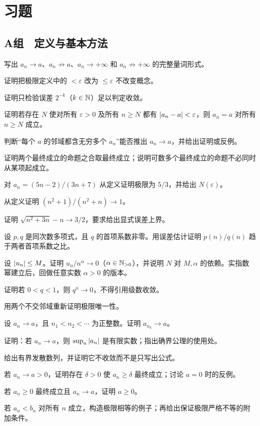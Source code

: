 \section*{习题}

\subsection*{A组　定义与基本方法}
\begin{enumerate}[label=\textbf{\thechapter.\arabic*.},ref=\thechapter.\arabic*,leftmargin=3.4em,labelsep=0.7em,itemsep=0.85em,topsep=0.8em]
  写出 \(a_n\to a\)、\(a_n\not\to a\)、\(a_n\to+\infty\) 和 \(a_n\not\to+\infty\) 的完整量词形式。

  证明把极限定义中的 \(<\varepsilon\) 改为 \(\le\varepsilon\) 不改变概念。

  证明只检验误差 \(2^{-k}\)（\(k\in\mathbb{N}\)）足以判定收敛。

  证明若存在 \(N\) 使对所有 \(\varepsilon>0\) 及所有 \(n\ge N\) 都有 \(\left|a_n-a\right|<\varepsilon\)，则 \(a_n=a\) 对所有 \(n\ge N\) 成立。

  判断“每个 \(a\) 的邻域都含无穷多个 \(a_n\)”能否推出 \(a_n\to a\)，并给出证明或反例。

  证明两个最终成立的命题之合取最终成立；说明可数多个最终成立的命题不必同时从某项起成立。

  对 \(a_n=(5n-2)/(3n+7)\) 从定义证明极限为 \(5/3\)，并给出 \(N(\varepsilon)\)。

  从定义证明 \((n^2+1)/(n^2+n)\to1\)。

  证明 \(\sqrt{n^2+3n}-n\to3/2\)，要求给出显式误差上界。

  设 \(p,q\) 是同次数多项式，且 \(q\) 的首项系数非零。用误差估计证明 \(p(n)/q(n)\) 趋于两者首项系数之比。

  设 \(\left|u_n\right|\le M\)。证明 \(u_n/n^\alpha\to0\)（\(\alpha\in\mathbb{N}_{>0}\)），并说明 \(N\) 对 \(M,\alpha\) 的依赖。实指数幂建立后，回做任意实数 \(\alpha>0\) 的版本。

  证明若 \(0<q<1\)，则 \(q^n\to0\)，不得引用级数收敛。

  用两个不交邻域重新证明极限唯一性。

  设 \(a_n\to a\)，且 \(n_1<n_2<\cdots\) 为正整数。证明 \(a_{n_k}\to a\)。

  证明：若 \(a_n\to a\)，则 \(\sup_n\left|a_n\right|\) 是有限实数；指出确界公理的使用处。

  给出有界发散数列，并证明它不收敛而不是只写出公式。

  若 \(a_n\to a>0\)，证明存在 \(\delta>0\) 使 \(a_n\ge\delta\) 最终成立；讨论 \(a=0\) 时的反例。

  若 \(a_n\ge0\) 最终成立且 \(a_n\to a\)，证明 \(a\ge0\)。

  若 \(a_n<b_n\) 对所有 \(n\) 成立，构造极限相等的例子；再给出保证极限严格不等的附加条件。
\end{enumerate}

